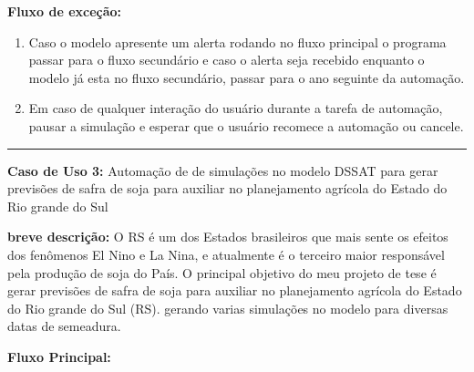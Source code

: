 \documentclass[12pt]{article}
\begin{document}
	{\bf Fluxo de exceção:}
	
	\begin{enumerate}
		\item Caso o modelo apresente um alerta rodando no fluxo principal o programa passar para o fluxo secundário e caso o alerta seja recebido enquanto o modelo já esta no fluxo secundário, passar para o ano seguinte da automação.
		\item Em caso de qualquer interação do usuário durante a tarefa de automação, pausar a simulação e esperar que o usuário recomece a automação ou cancele.
	\end{enumerate}
	
	\bigskip \hrule \bigskip

	
	{\bf Caso de Uso 3:} Automação de de simulações no modelo DSSAT para gerar previsões de safra de soja para auxiliar no planejamento agrícola do Estado do Rio grande do Sul
	\bigskip
	
	{\bf breve descrição:} O RS é um dos Estados brasileiros que mais sente os efeitos dos fenômenos El Nino e La Nina, e atualmente é o terceiro maior responsável pela produção de soja do País. O principal objetivo do meu projeto de tese é gerar previsões de safra de soja para auxiliar no planejamento agrícola do Estado do Rio grande do Sul (RS). gerando varias simulações no modelo para diversas datas de semeadura.
	\bigskip
	
	{\bf Fluxo Principal:}
	
\end{document}

